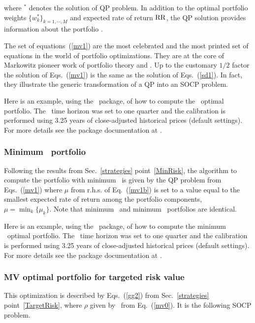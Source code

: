 \noindent where $^*$ denotes the solution of QP problem.
In addition to the optimal portfolio weights $\{w_k^*\}_{k=1,\cdots,M}$ and expected
rate of return ${\rm RR}$, the
QP solution provides information about the portfolio \VAR.

The set of equations~(\ref{mv1}) are the most celebrated and the most printed set of equations in the world of portfolio optimizations.
They are at the core of Markowitz pioneer work of portfolio theory \cite{Markowitz} and \cite{Markowitz2}. Up to the customary $1/2$ factor
the solution of Eqs.~(\ref{mv1}) is the same as the solution of Eqs.~(\ref{sd1}). In fact, they illustrate the generic transformation of
a QP into an SOCP problem.

\bigskip
\noindent Here is an example, using the \azapy\ package, of how to compute the \MV\ optimal portfolio.
The \VAR\ time horizon was set to one quarter and the calibration is performed using 3.25 years of
close-adjusted historical prices (default settings).
For more details see the package documentation at \azapydoc.



\BackToContents


\subsubsection{Minimum \VAR\ portfolio}

Following the results from Sec.~\ref{strategies} point~\ref{MinRisk},
the algorithm to compute the portfolio with minimum \VAR\ is given by the QP problem from Eqs.~(\ref{mv1}) where
$\mu$ from r.h.s. of Eq.~(\ref{mv1b}) is set to a value equal to the smallest expected rate of
return among the portfolio components, \ie\ $\mu=\min_k\{\mu_k\}$.
Note that minimum \VAR\ and minimum \SD\ portfolios are identical.

\bigskip
\noindent Here is an example, using the \azapy\ package, of how to compute the minimum \VAR\ optimal portfolio.
The \VAR\ time horizon was set to one quarter and the calibration is performed using 3.25 years of
close-adjusted historical prices (default settings).
For more details see the package documentation at \azapydoc.



\BackToContents


\subsubsection{MV optimal portfolio for targeted risk value}
This optimization is described by Eqs.~(\ref{gg2}) from Sec.~\ref{strategies} point~\ref{TargetRisk},
where $\rho$ given by \VAR\ from Eq.\ (\ref{mv0}).
It is the following SOCP problem.

